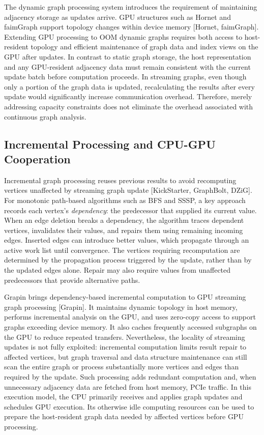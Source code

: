 The dynamic graph processing system introduces the requirement of maintaining adjacency storage as updates arrive. GPU structures such as Hornet and faimGraph support topology changes within device memory [Hornet, faimGraph]. Extending GPU processing to OOM dynamic graphs requires both access to host-resident topology and efficient maintenance of graph data and index views on the GPU after updates. In contrast to static graph storage, the host representation and any GPU-resident adjacency data must remain consistent with the current update batch before computation proceeds. In streaming graphs, even though only a portion of the graph data is updated, recalculating the results after every update would significantly increase communication overhead. Therefore, merely addressing capacity constraints does not eliminate the overhead associated with continuous graph analysis.

\subsection{Incremental Processing and CPU-GPU Cooperation}

Incremental graph processing reuses previous results to avoid recomputing vertices unaffected by streaming graph update [KickStarter, GraphBolt, DZiG]. For monotonic path-based algorithms such as BFS and SSSP, a key approach records each vertex's \emph{dependency}: the predecessor that supplied its current value. When an edge deletion breaks a dependency, the algorithm traces dependent vertices, invalidates their values, and repairs them using remaining incoming edges. Inserted edges can introduce better values, which propagate through an active work list until convergence. The vertices requiring recomputation are determined by the propagation process triggered by the update, rather than by the updated edges alone. Repair may also require values from unaffected predecessors that provide alternative paths.

Grapin brings dependency-based incremental computation to GPU streaming graph processing [Grapin]. It maintains dynamic topology in host memory, performs incremental analysis on the GPU, and uses zero-copy access to support graphs exceeding device memory. It also caches frequently accessed subgraphs on the GPU to reduce repeated transfers. Nevertheless, the locality of streaming updates is not fully exploited: incremental computation limits result repair to affected vertices, but graph traversal and data structure maintenance can still scan the entire graph or process substantially more vertices and edges than required by the update. Such processing adds redundant computation and, when unnecessary adjacency data are fetched from host memory, PCIe traffic. In this execution model, the CPU primarily receives and applies graph updates and schedules GPU execution. Its otherwise idle computing resources can be used to prepare the host-resident graph data needed by affected vertices before GPU processing.

